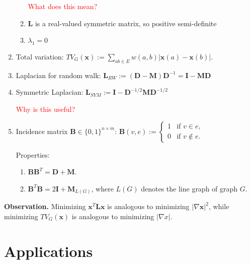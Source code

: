 \documentclass[11pt,letterpaper]{article}
\begin{document}
\begin{enumerate}[label=(\alph*)]
\begin{enumerate}[label=(\arabic*)]
    \textcolor{red}{What does this mean?}

    \item $\bm{L}$ is a real-valued symmetric matrix, so positive semi-definite
    \item $\lambda_1=0$
  \end{enumerate}
  
  \item Total variation: $TV_G(\bm{x}) := \sum_{ab \in E} w(a,b) \left|\bm{x}(a) - \bm{x}(b)\right|$.
  \item Laplacian for random walk: $\bm{L}_{RW} := (\bm{D}-\bm{M})\bm{D}^{-1} = \bm{I} - \bm{M}\bm{D}$
  \item Symmetric Laplacian: $\bm{L}_{SYM} := \bm{I} - \bm{D}^{-1/2}\bm{M}\bm{D}^{-1/2}$

  \textcolor{red}{Why is this useful?}

  \item Incidence matrix $\bm{B} \in \{0,1\}^{n \times m}$: $\bm{B}(v,e) := \begin{cases}
    1 &\text{if } v \in e,\\
    0 &\text{if } v \notin e.
  \end{cases}$

  Properties:
  \begin{enumerate}[label=(\arabic*)]
  \item $\bm{B}\bm{B}^T = \bm{D} + \bm{M}$.
  \item $\bm{B}^T \bm{B}=2\bm{I} + \bm{M}_{L(G)}$, where $L(G)$ denotes the line graph of graph $G$.
  \end{enumerate}
\end{enumerate}

\textbf{Observation.} Minimizing $\bm{x}^T\bm{L}\bm{x}$ is analogous to minimizing $|\nabla \bm{x}|^2$,
while minimizing $TV_G(\bm{x})$ is analogous to minimizing $|\nabla x|$.

\section{Applications}
\end{document}
